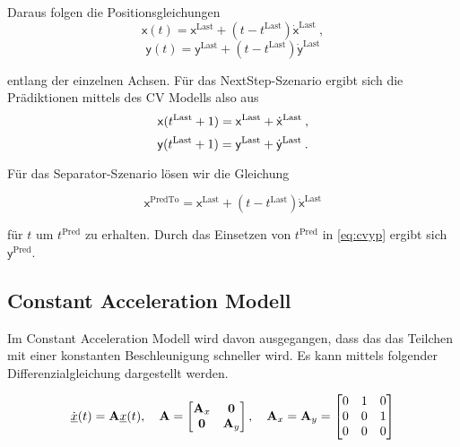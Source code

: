 Daraus folgen die Positionsgleichungen 
\begin{equation*}
    \mathsf{x}(t) = \mathsf{x}^{\text{Last}} + (t - t^{\text{Last}})\dot{\mathsf{x}}^{\text{Last}} \: ,
\end{equation*}
\begin{equation*}
    \mathsf{y}(t) = \mathsf{y}^{\text{Last}} + (t - t^{\text{Last}})\dot{\mathsf{y}}^{\text{Last}}
\end{equation*}

entlang der einzelnen Achsen.
Für das NextStep-Szenario ergibt sich die Prädiktionen mittels des CV Modells also aus
\begin{equation*}
    \mathsf{x}(t{^{\text{Last}}}+1) = \mathsf{x}^{\text{Last}} + \dot{\mathsf{x}}^{\text{Last}} \: ,
\end{equation*}
\begin{equation}\label{eq:cvyp}
    \mathsf{y}(t{^{\text{Last}}}+1) = \mathsf{y}^{\text{Last}} + \dot{\mathsf{y}}^{\text{Last}} \: .
\end{equation}

Für das Separator-Szenario lösen wir die Gleichung 

\begin{equation*}
    \mathsf{x}^{\text{PredTo}} = \mathsf{x}^{\text{Last}} + (t - t^{\text{Last}})\dot{\mathsf{x}}^{\text{Last}}
\end{equation*}

für \(t\) um  \(t^{\text{Pred}}\) zu erhalten.
Durch das Einsetzen von \(t^{\text{Pred}}\) in \eqref{eq:cvyp} ergibt sich \(\mathsf{y}^{\text{Pred}}\).

\subsection{Constant Acceleration Modell}

Im Constant Acceleration Modell wird davon ausgegangen, dass das das Teilchen mit einer konstanten Beschleunigung schneller wird.
Es kann mittels folgender Differenzialgleichung dargestellt werden.

\begin{align*} \label{eq:speedCV}
    \dot{{\underline{x}}}(t) = {{\mathbf{A}}}{\underline{x}}(t), \quad {\ensuremath{{\mathbf{A}}}} = 
    \begin{bmatrix}
        {\ensuremath{{\mathbf{A}}}}_x & \boldsymbol{0} \\
        \boldsymbol{0} & {{\mathbf{A}}}_y
    \end{bmatrix} 
    , \quad
    {\ensuremath{{\mathbf{A}}}}_x = {{\mathbf{A}}}_y = 
    \begin{bmatrix}
        0 & 1 & 0 \\
        0 & 0 & 1 \\
        0 & 0 & 0
    \end{bmatrix} 
\end{align*}


